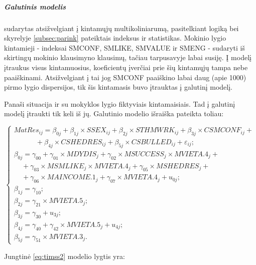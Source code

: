 \documentclass[12pt,a4paper]{article}
\begin{document}
\subparagraph{Galutinis modelis} sudarytas atsižvelgiant į kintamųjų multikoliniarumą, pasitelkiant logiką bei skyrelyje \ref{subsec:parink} pateiktais indeksus ir statistikas. Mokinio lygio kintamieji - indeksai SMCONF, SMLIKE, SMVALUE ir SMENG - sudaryti iš skirtingų mokinio klausimyno klausimų, tačiau tarpusavyje labai susiję. Į modelį įtraukus visus kintamuosius, koeficientų įverčiai prie šių kintamųjų tampa nebe paaiškinami. Atsižvelgiant į tai jog SMCONF paaiškino labai daug (apie 1000) pirmo lygio dispersijos, tik šis kintamasis buvo įtrauktas į galutinį modelį.

\indent Panaši situacija ir su mokyklos lygio fiktyviais kintamaisiais. Tad į galutinį modelį įtraukti tik keli iš jų. Galutinio modelio išraiška pateikta toliau:
\begin{small}
\begin{equation} \label{eq:timss2}
\left\{
\begin{array}{l}
MatRes_{ij}=\beta_{0j}+\beta_{1j}\times SSEX_{ij}+\beta_{2j} \times STHMWRK_{ij}+\beta_{3j}\times CSMCONF_{ij}+\\
\ \ \ \ \ \ \ \ \ \ \ \ \ \ +\beta_{4j}\times CSHEDRES_{ij}+\beta_{5j}\times CSBULLED_{ij}+\varepsilon_{ij};\\
\beta_{0j}=\gamma_{00}+\gamma_{01}\times MDYDIS_j+\gamma_{02}\times MSUCCESS_j\times MVIETA.4_j+\\
\ \ \ \ \ +\gamma_{03}\times MSMLIKE_j\times MVIETA.4_j+\gamma_{05}\times MSHEDRES_j+\\
\ \ \ \ \ +\gamma_{06}\times MAINCOME.1_j+\gamma_{07}\times MVIETA.4_j+u_{0j};\\
\beta_{1j} = \gamma_{10};\\
\beta_{2j}=\gamma_{21}\times MVIETA.5_j;\\
\beta_{3j}=\gamma_{30}+u_{3j};\\
\beta_{4j}=\gamma_{40}+\gamma_{42}\times MVIETA.5_j+u_{4j};\\
\beta_{5j}=\gamma_{51}\times MVIETA.3_j.
\end{array} \right.
\end{equation}
\end{small}
Jungtinė \ref{eq:timss2} modelio lygtis yra:
\end{document}
